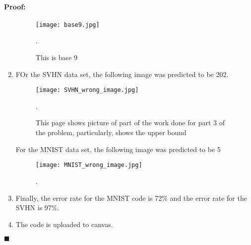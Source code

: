 \documentclass[12pt]{article}
\newenvironment{proof}{\paragraph{Proof: }}{\hfill$\blacksquare$}
\begin{document}
\begin{proof}
\begin{enumerate}
\begin{figure}[!htbp]
\centering
\texttt{[image: base9.jpg]}
\caption{This is base 9}.
\end{figure}



\item FOr the SVHN data set, the following image was predicted to be 202.

\begin{figure}[!htbp]
\centering
\texttt{[image: SVHN\_wrong\_image.jpg]}
\caption{This page shows picture of part of the work done for part 3 of the problem, particularly, shows the upper bound}.
\end{figure}

For the MNIST data set, the following image was predicted to be 5

\begin{figure}[!htbp]
\centering
\texttt{[image: MNIST\_wrong\_image.jpg]}
\caption{}.
\end{figure}

\item Finally, the error rate for the MNIST code is 72\% and the error rate for the SVHN is 97\%.

\item The code is uploaded to canvas.

\end{enumerate}

\end{proof}
\end{document}
